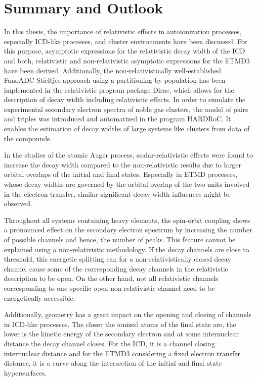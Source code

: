 \chapter{Summary and Outlook}

In this thesis, the importance of relativistic effects in autoionization
processes, especially \ac{ICD}-like
processes, and cluster environments have been discussed.
For this purpose, asymptotic expressions for the relativistic decay width of the ICD
and both, relativistic and non-relativistic asymptotic expressions for the ETMD3
have been derived. Additionally, the non-relativistically well-established
FanoADC-Stieltjes approach
using a partitioning by population has been implemented
in the relativistic program package Dirac,
which allows for the
description of decay width including relativistic effects.
In order to simulate the experimental secondary electron spectra of noble gas
clusters, the model of pairs and triples was introduced and automatized in the
program HARDRoC. It enables the estimation of
decay widths of large systems like clusters from data of the compounds.

In the studies of the atomic Auger process, scalar-relativistic effects were
found to increase the decay width compared to the non-relativistic results
due to larger orbital overlaps of the initial and final states. Especially
in ETMD processes, whose decay widths are governed by the orbital overlap
of the two units involved in the electron transfer, similar significant
decay width influences might be observed.

Throughout all systems containing heavy elements, the spin-orbit coupling
shows a pronounced effect on the secondary electron spectrum by increasing the
number of possible channels and hence, the number of peaks. This feature cannot
be explained using a non-relativistic methodology.
If the decay channels are close to threshold, this energetic splitting
can for a non-relativistically closed decay channel cause some of the
corresponding decay channels in the relativistic description to be open. On
the other hand, not all relativistic channels corresponding to one specific
open non-relativistic channel need to be energetically accessible.

Additionally, geometry has a great impact on the opening and closing of channels
in \ac{ICD}-like processes. The closer the ionized atoms of the final state are,
the lower is the kinetic energy of the secondary electron and at some
internuclear distance the decay channel closes. For the ICD, it is a channel
closing internuclear distance and for the ETMD3 considering a fixed electron
transfer distance, it is a curve along the intersection of the initial and final
state hypersurfaces.

